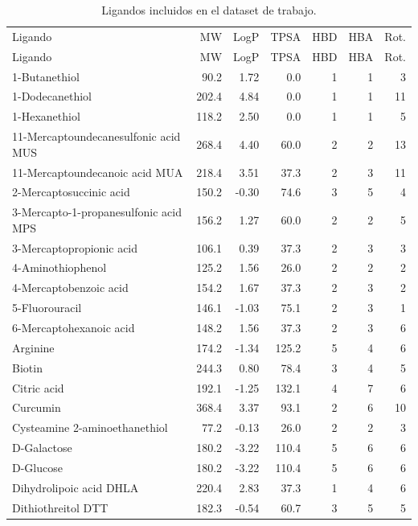 \documentclass[
  spanish,
  a4paper,
  12pt,
  oneside,
  openany]{memoir}
\begin{document}
\begin{longtable}{p{}rrrrrr}

\caption{\label{tbl-anexo-ligandos-tabla}Ligandos incluidos en el
dataset de trabajo.}

\tabularnewline

\\
\toprule
Ligando & MW & LogP & TPSA & HBD & HBA & Rot.\\
\midrule
\endfirsthead
\toprule
Ligando & MW & LogP & TPSA & HBD & HBA & Rot.\\
\midrule
\endhead
1-Butanethiol & 90.2 & 1.72 & 0.0 & 1 & 1 & 3\\
1-Dodecanethiol & 202.4 & 4.84 & 0.0 & 1 & 1 & 11\\
1-Hexanethiol & 118.2 & 2.50 & 0.0 & 1 & 1 & 5\\
11-Mercaptoundecanesulfonic acid MUS & 268.4 & 4.40 & 60.0 & 2 & 2 & 13\\
11-Mercaptoundecanoic acid MUA & 218.4 & 3.51 & 37.3 & 2 & 3 & 11\\
2-Mercaptosuccinic acid & 150.2 & -0.30 & 74.6 & 3 & 5 & 4\\
3-Mercapto-1-propanesulfonic acid MPS & 156.2 & 1.27 & 60.0 & 2 & 2 & 5\\
3-Mercaptopropionic acid & 106.1 & 0.39 & 37.3 & 2 & 3 & 3\\
4-Aminothiophenol & 125.2 & 1.56 & 26.0 & 2 & 2 & 2\\
4-Mercaptobenzoic acid & 154.2 & 1.67 & 37.3 & 2 & 3 & 2\\
5-Fluorouracil & 146.1 & -1.03 & 75.1 & 2 & 3 & 1\\
6-Mercaptohexanoic acid & 148.2 & 1.56 & 37.3 & 2 & 3 & 6\\
Arginine & 174.2 & -1.34 & 125.2 & 5 & 4 & 6\\
Biotin & 244.3 & 0.80 & 78.4 & 3 & 4 & 5\\
Citric acid & 192.1 & -1.25 & 132.1 & 4 & 7 & 6\\
Curcumin & 368.4 & 3.37 & 93.1 & 2 & 6 & 10\\
Cysteamine 2-aminoethanethiol & 77.2 & -0.13 & 26.0 & 2 & 2 & 3\\
D-Galactose & 180.2 & -3.22 & 110.4 & 5 & 6 & 6\\
D-Glucose & 180.2 & -3.22 & 110.4 & 5 & 6 & 6\\
Dihydrolipoic acid DHLA & 220.4 & 2.83 & 37.3 & 1 & 4 & 6\\
Dithiothreitol DTT & 182.3 & -0.54 & 60.7 & 3 & 5 & 5\\

\end{longtable}
\end{document}
